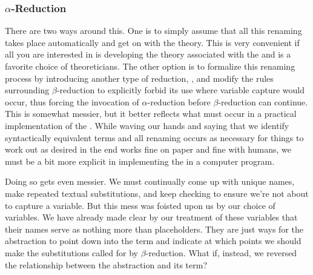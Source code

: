 \subsubsection{\texorpdfstring{$\alpha$-Reduction}{Alpha-Reduction}}\label{untyped:alpha}
There are two ways around this. One is to simply assume that all this renaming takes place automatically and get on with the theory. This is very convenient if all you are interested in is developing the theory associated with the \lambdacalc and is a favorite choice of theoreticians. The other option is to formalize this renaming process by introducing another type of reduction, , and modify the rules surrounding $\beta$-reduction to explicitly forbid its use where variable capture would occur, thus forcing the invocation of $\alpha$-reduction before $\beta$-reduction can continue. This is somewhat messier, but it better reflects what must occur in a practical implementation of the \lambdacalc{}. While waving our hands and saying that we identify syntactically equivalent terms and all renaming occurs as necessary for things to work out as desired in the end works fine on paper and fine with humans, we must be a bit more explicit in implementing the \lambdacalc in a computer program.

Doing so gets even messier. We must continually come up with unique names, make repeated textual substitutions, and keep checking to ensure we're not about to capture a variable. But this mess was foisted upon us by our choice of variables. We have already made clear by our treatment of these variables that their names serve as nothing more than placeholders. They are just ways for the abstraction to point down into the term and indicate at which points we should make the substitutions called for by $\beta$-reduction. What if, instead, we reversed the relationship between the abstraction and its term?

